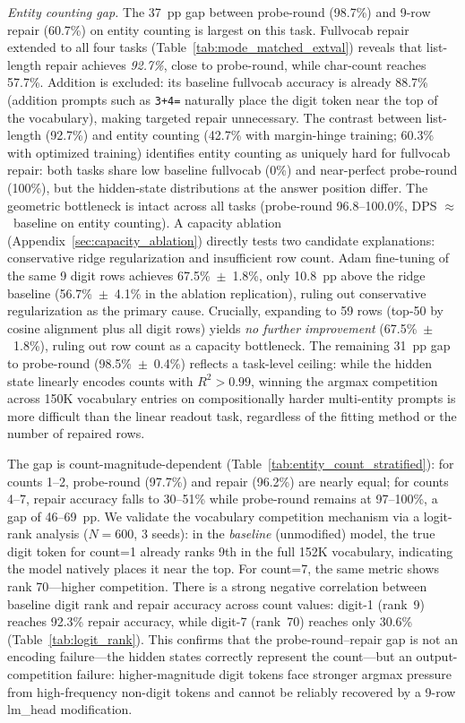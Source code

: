 \documentclass{article}
\begin{document}
\noindent
\emph{Entity counting gap.} The 37~pp gap between probe-round (98.7\%) and
9-row repair (60.7\%) on entity counting is largest on this task.
Fullvocab repair extended to all four tasks (Table~\ref{tab:mode_matched_extval}) reveals that list-length repair achieves \emph{92.7\%}, close to probe-round, while char-count reaches 57.7\%. Addition is excluded: its baseline fullvocab accuracy is already 88.7\% (addition prompts such as \texttt{3+4=} naturally place the digit token near the top of the vocabulary), making targeted repair unnecessary. The contrast between list-length (92.7\%) and entity counting (42.7\% with margin-hinge training; 60.3\% with optimized training) identifies entity counting as uniquely hard for fullvocab repair: both tasks share low baseline fullvocab (0\%) and near-perfect probe-round (100\%), but the hidden-state distributions at the answer position differ.
The geometric bottleneck is intact across all tasks (probe-round 96.8--100.0\%, DPS $\approx$~baseline on entity counting).
A capacity ablation (Appendix~\ref{sec:capacity_ablation}) directly tests two candidate
explanations: conservative ridge regularization and insufficient row count.
Adam fine-tuning of the same 9 digit rows achieves 67.5\%~$\pm$~1.8\%,
only 10.8~pp above the ridge baseline (56.7\%~$\pm$~4.1\% in the ablation replication),
ruling out conservative regularization as the primary cause.
Crucially, expanding to 59 rows (top-50 by cosine alignment plus all digit rows)
yields \emph{no further improvement} (67.5\%~$\pm$~1.8\%), ruling out row count as a
capacity bottleneck.
The remaining 31~pp gap to probe-round (98.5\%~$\pm$~0.4\%) reflects a task-level
ceiling: while the hidden state linearly encodes counts with $R^2>0.99$,
winning the argmax competition across 150K vocabulary entries on compositionally
harder multi-entity prompts is more difficult than the linear readout task,
regardless of the fitting method or the number of repaired rows.

The gap is count-magnitude-dependent (Table~\ref{tab:entity_count_stratified}): for counts 1--2, probe-round (97.7\%) and repair (96.2\%) are nearly equal; for counts 4--7, repair accuracy falls to 30--51\% while probe-round remains at 97--100\%, a gap of 46--69~pp. We validate the vocabulary competition mechanism via a logit-rank analysis ($N=600$, 3 seeds): in the \emph{baseline} (unmodified) model, the true digit token for count=1 already ranks 9th in the full 152K vocabulary, indicating the model natively places it near the top. For count=7, the same metric shows rank 70---higher competition. There is a strong negative correlation between baseline digit rank and repair accuracy across count values: digit-1 (rank~9) reaches 92.3\% repair accuracy, while digit-7 (rank~70) reaches only 30.6\% (Table~\ref{tab:logit_rank}). This confirms that the probe-round--repair gap is not an encoding failure---the hidden states correctly represent the count---but an output-competition failure: higher-magnitude digit tokens face stronger argmax pressure from high-frequency non-digit tokens and cannot be reliably recovered by a 9-row lm\_head modification.
\end{document}
